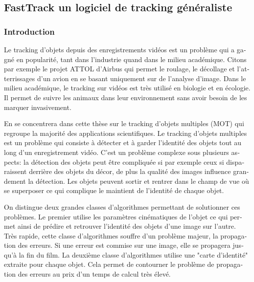 \begin{otherlanguage}{french}
\subsubsection*{}
\subsection*{FastTrack un logiciel de tracking généraliste}
\subsubsection*{Introduction}
Le tracking d'objets depuis des enregistrements vidéos est un problème qui a gagné en popularité, tant dans l'industrie quand dans le milieu académique. Citons par exemple le projet ATTOL d'Airbus qui permet le roulage, le décollage et l'atterrissages d'un avion en se basant uniquement sur de l'analyse d'image. Dans le milieu académique, le tracking sur vidéos est très utilisé en biologie et en écologie. Il permet de suivre les animaux dans leur environnement sans avoir besoin de les marquer invasivement.

En se concentrera dans cette thèse sur le tracking d'objets multiples (MOT) qui regroupe la majorité des applications scientifiques. Le tracking d'objets multiples est un problème qui consiste à détecter et à garder l'identité des objets tout au long d'un enregistrement vidéo. C'est un problème complexe sous plusieurs aspects: la détection des objets peut être compliquée si par exemple ceux si disparaissent derrière des objets du décor, de plus la qualité des images influence grandement la détection. Les objets peuvent sortir et rentrer dans le champ de vue où se superposer ce qui complique le maintient de l'identité de chaque objet.

On distingue deux grandes classes d'algorithmes permettant de solutionner ces problèmes. Le premier utilise les paramètres cinématiques de l'objet ce qui permet ainsi de prédire et retrouver l'identité des objets d'une image sur l'autre. Très rapide, cette classe d'algorithmes souffre d'un problème majeur, la propagation des erreurs. Si une erreur est commise sur une image, elle se propagera jusqu'à la fin du film. La deuxième classe d'algorithmes utilise une "carte d'identité" extraite pour chaque objet. Cela permet de contourner le problème de propagation des erreurs au prix d'un temps de calcul très élevé.


\end{otherlanguage}
